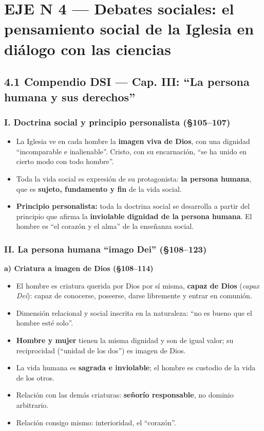 \documentclass[10pt,a4paper]{article}
\begin{document}
\clearpage\section{EJE N\textordmasculine{} 4 --- Debates sociales: el pensamiento social de la Iglesia en diálogo con las ciencias}

\subsection{4.1 Compendio DSI --- Cap. III: ``La persona humana y sus derechos''}

\subsubsection{I. Doctrina social y principio personalista (\S{}105--107)}
\begin{itemize}
\item La Iglesia ve en cada hombre la \textbf{imagen viva de Dios}, con una dignidad ``incomparable e inalienable''. Cristo, con su encarnación, ``se ha unido en cierto modo con todo hombre''.
\item Toda la vida social es expresión de su protagonista: \textbf{la persona humana}, que es \textbf{sujeto, fundamento y fin} de la vida social.
\item \textbf{Principio personalista:} toda la doctrina social se desarrolla a partir del principio que afirma la \textbf{inviolable dignidad de la persona humana}. El hombre es ``el corazón y el alma'' de la enseñanza social.
\end{itemize}

\subsubsection{II. La persona humana ``imago Dei'' (\S{}108--123)}
\medskip\noindent \textbf{a) Criatura a imagen de Dios (\S{}108--114)}\par\nopagebreak
\begin{itemize}
\item El hombre es criatura querida por Dios por sí misma, \textbf{capaz de Dios} (\textit{capax Dei}): capaz de conocerse, poseerse, darse libremente y entrar en comunión.
\item Dimensión relacional y social inscrita en la naturaleza: ``no es bueno que el hombre esté solo''.
\item \textbf{Hombre y mujer} tienen la misma dignidad y son de igual valor; su reciprocidad (``unidad de los dos'') es imagen de Dios.
\item La vida humana es \textbf{sagrada e inviolable}; el hombre es custodio de la vida de los otros.
\item Relación con las demás criaturas: \textbf{señorío responsable}, no dominio arbitrario.
\item Relación consigo mismo: interioridad, el ``corazón''.
\end{itemize}
\end{document}
